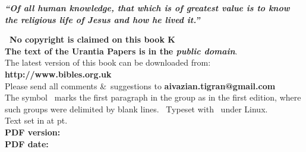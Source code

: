 
\newpage
\makeatletter
{}%
\makeatother

\newcommand{\serpimolot}{{\fontspec{Mortbats} K}}

\begin{center}
\begin{center}\parbox{7cm}{\bfseries\itshape ``Of all human knowledge, that which is of greatest value is to know the religious life of Jesus and how he lived it.'' }\end{center}
\parbox{0.9\linewidth}{\centering
\textbf{\upshape\nocopyright\ No copyright is claimed on this book \serpimolot\\
The text of the Urantia Papers is in the \itshape public domain}.\\[5pt]
The latest version of this book can be downloaded from:\\
{\upshape\bfseries http://www.bibles.org.uk}\\
Please send all comments \&\ suggestions to {\makeatletter\upshape\bfseries aivazian.tigran@gmail.com\makeatother}\\
The symbol \pc\ marks the first paragraph in the group as in the first edition, where such groups were delimited by blank lines.
\tux\ Typeset with \XeLaTeX\ under Linux.\\
Text set in \textbf{\urantiamainfont} at \urantiamainfontsize pt.\\[18pt]
\upshape\small\bfseries PDF version: \\
\upshape\small\bfseries PDF date: \mytoday{}\\
}
\end{center}

